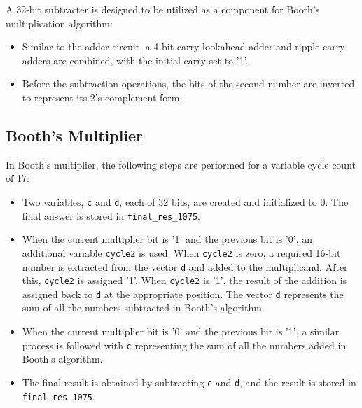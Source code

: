 \documentclass[11pt]{article}
\begin{document}
A 32-bit subtracter is designed to be utilized as a component for Booth's multiplication algorithm:

\begin{itemize}
    \item Similar to the adder circuit, a 4-bit carry-lookahead adder and ripple carry adders are combined, with the initial carry set to '1'.
    \item Before the subtraction operations, the bits of the second number are inverted to represent its 2's complement form.
\end{itemize}

\subsection{Booth's Multiplier}

In Booth's multiplier, the following steps are performed for a variable cycle count of 17:

\begin{itemize}
    \item Two variables, \texttt{c} and \texttt{d}, each of 32 bits, are created and initialized to 0. The final answer is stored in \texttt{final\_res\_1075}.
    \item When the current multiplier bit is '1' and the previous bit is '0', an additional variable \texttt{cycle2} is used. When \texttt{cycle2} is zero, a required 16-bit number is extracted from the vector \texttt{d} and added to the multiplicand. After this, \texttt{cycle2} is assigned '1'. When \texttt{cycle2} is '1', the result of the addition is assigned back to \texttt{d} at the appropriate position. The vector \texttt{d} represents the sum of all the numbers subtracted in Booth's algorithm.
    \item When the current multiplier bit is '0' and the previous bit is '1', a similar process is followed with \texttt{c} representing the sum of all the numbers added in Booth's algorithm.
    \item The final result is obtained by subtracting \texttt{c} and \texttt{d}, and the result is stored in \texttt{final\_res\_1075}.
\end{itemize}
\end{document}
